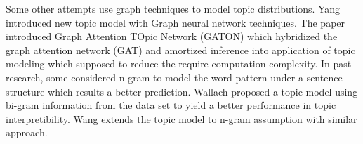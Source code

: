 Some other attempts use graph techniques to model topic distributions.
Yang\cite{yang_graph_2020} introduced new topic model with Graph neural network techniques. The paper introduced Graph Attention TOpic Network (GATON) which hybridized the graph attention network (GAT) and amortized inference into application of topic modeling which supposed to reduce the require computation complexity.
In past research, some considered n-gram to model the word pattern under a sentence structure which results a better prediction.
Wallach \cite{wallach_topic_2006} proposed a topic model using bi-gram information from the data set to yield a better performance in topic interpretibility.
Wang \cite{wang_topical_2007} extends the topic model to n-gram assumption with similar approach.


